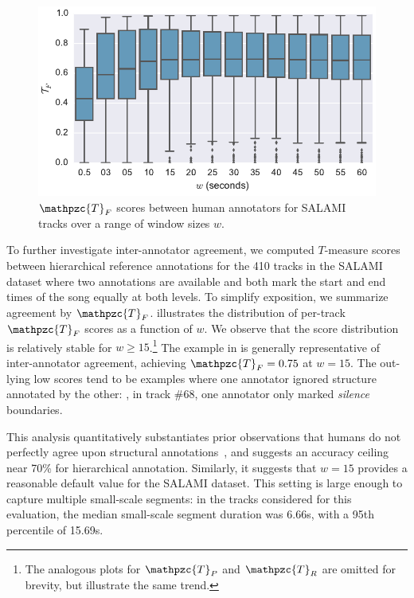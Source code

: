 \documentclass{article}
\def\shag{\ensuremath{\mathpzc{T}}}
\begin{document}
\begin{figure}
    \centering
    \includegraphics[width=\columnwidth]{figs/tfw}
    \caption{$\shag_F$ scores between human annotators for SALAMI tracks over a range of window sizes $w$.\label{fig:salami-agree}}
\end{figure}

To further investigate inter-annotator agreement, we computed $T$-measure scores between hierarchical
reference annotations for the 410 tracks in the SALAMI dataset where two annotations are available and
both mark the start and end times of the song equally at both levels.  
To simplify exposition, we
summarize agreement by $\shag_F$.  illustrates the distribution of
per-track $\shag_F$ scores as a function of $w$.  We observe that the score distribution is relatively stable
for $w \geq 15$.\footnote{The analogous plots for $\shag_P$ and $\shag_R$ are omitted for brevity, but illustrate the same
trend.} 
The example in  
is generally representative of inter-annotator agreement,
achieving $\shag_F = 0.75$ at $w=15$.
The out-lying low scores tend to be examples where one annotator ignored structure annotated
by the other: \eg, in track \#68, one annotator only marked \emph{silence} boundaries.

This analysis quantitatively substantiates prior observations that humans do not perfectly agree upon structural
annotations~\cite{Smith2013}, and suggests an accuracy ceiling near 70\% for hierarchical annotation.
Similarly, it suggests that $w=15$ provides a reasonable default value for the SALAMI dataset.  This setting
is large enough to capture multiple small-scale segments: in the tracks considered for this evaluation, 
the median small-scale segment duration was 6.66s, with a 95th percentile of 15.69s.
\end{document}
